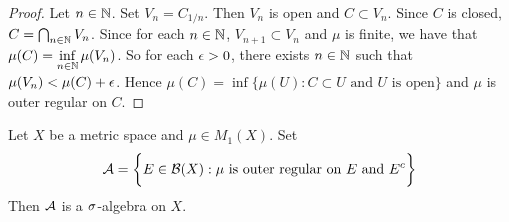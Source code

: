 \documentclass{book}
\begin{document}
	\begin{proof}
		Let $n \in \mathbb{N}$. Set $V_n = C_{1/n}$. Then $V_n$ is open and $C \subset V_n$. Since $C$ is closed, $C = \bigcap_{n \in \mathbb{N}} V_n$. Since for each $n \in \mathbb{N}$, $V_{n+1} \subset V_n$ and $\mu$ is finite, we have that $\mu(C) = \inf\limits_{n \in \mathbb{N}} \mu(V_n)$. So for each $\epsilon >0$, there exists $n \in \mathbb{N}$ such that $\mu(V_n) < \mu(C) + \epsilon$. Hence $\mu(C) = \inf \{\mu(U): C \subset U \text{ and $U$ is open} \}$ and $\mu$ is outer regular on $C$.    
	\end{proof}
	
	\begin{ex} 
		Let $X$ be a metric space and $\mu \in M_1(X)$. Set 
		$$\mathcal{A} = \bigg \{E \in \mathcal{B}(X): \text{$\mu$ is outer regular on $E$ and $E^c$} \bigg\}$$  
		Then $\mathcal{A}$ is a $\sigma$-algebra on $X$.
	\end{ex}	
	
\end{document}

